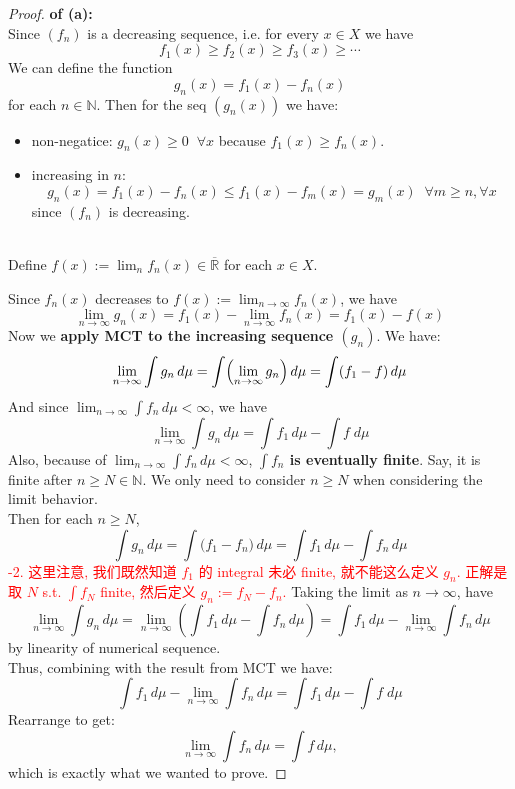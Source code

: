 \documentclass[lang=cn,11pt]{elegantbook}
\begin{document}
\begin{proof}
\textbf{of (a):}\\
Since \((f_n)\) is a decreasing sequence, i.e. for every \(x\in X\) we have
\[
f_1(x) \ge f_2(x) \ge f_3(x) \ge \cdots 
\]
We can define the function
\[
g_n(x) = f_1(x) - f_n(x)
\] for each $n \in \mathbb{N}$. Then for the seq $(g_n(x))$ we have:
\begin{itemize}
    \item non-negatice: \(g_n(x) \ge 0 \;\; \forall x\) because \(f_1(x) \ge f_n(x)\).
    \item  increasing in $n$:\[
  g_n(x) = f_1(x) - f_n(x) \le f_1(x) - f_m(x) = g_m(x) \;\;\forall  m\geq n, \forall x
  \] since \((f_n)\) is decreasing.\\\\
\end{itemize}

Define $f(x) := \lim_n f_n(x) \in \overline{\mathbb{R}}$ for each $x \in X$.

Since \(f_n(x)\) decreases to \(f(x):=\lim_{n\to\infty} f_n(x)\), we have \[
  \lim_{n\to\infty} g_n(x) = f_1(x) - \lim_{n\to\infty} f_n(x) = f_1(x) - f(x)
  \]
Now we \textbf{apply MCT to the increasing sequence \((g_n)\)}. We have:
\[
\lim_{n\to\infty} \int g_n\,d\mu = \int \Bigl(\lim_{n\to\infty} g_n\Bigr)\,d\mu = \int (f_1 - f)\,d\mu
\]
And since \(\lim_{n\to\infty}\int f_n\,d\mu < \infty\), we have\[
\lim_{n\to\infty} \int g_n\,d\mu = \int f_1 \, d\mu - \int f \;d\mu
\] Also, because of \(\lim_{n\to\infty}\int f_n\,d\mu < \infty\), \textbf{$\int f_n $ is eventually finite}. Say, it is finite after $n\geq N \in \mathbb{N}$. We only need to consider $n\geq N$ when considering the limit behavior.\\
Then for each \(n \geq N\),
\[
\int g_n\,d\mu = \int \bigl(f_1 - f_n\bigr)\,d\mu = \int f_1\,d\mu - \int f_n\,d\mu
\]
\textcolor{red}{-2. 这里注意, 我们既然知道 $f_1$ 的 integral 未必 finite, 就不能这么定义 $g_n$. 正解是取 $N$ s.t. $\int f_N$ finite, 然后定义 $g_n := f_N - f_n$.}
Taking the limit as \(n\to\infty\), have
\[
\lim_{n\to\infty} \int g_n\,d\mu = \lim_{n\to\infty} \left(\int f_1\,d\mu - \int f_n\,d\mu\right) = \int f_1\,d\mu - \lim_{n\to\infty} \int f_n\,d\mu
\]
by linearity of numerical sequence.\\
Thus, combining with the result from MCT we have:
\[
\int f_1\,d\mu - \lim_{n\to\infty} \int f_n\,d\mu =  \int f_1 \,d\mu- \int f \;d\mu
\]
Rearrange to get:
\[
\lim_{n\to\infty} \int f_n\,d\mu = \int f\,d\mu,
\]
which is exactly what we wanted to prove.
\end{proof}
\end{document}
